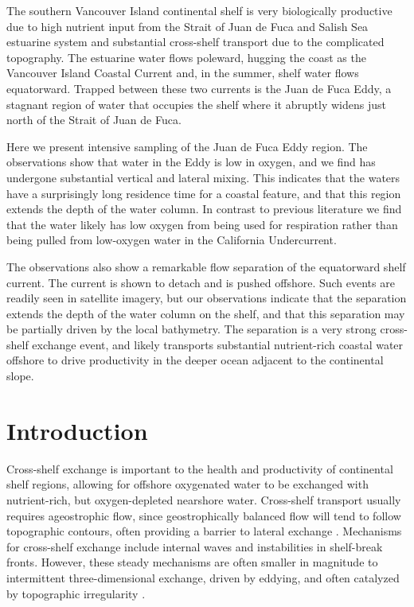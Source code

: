 \documentclass[draft]{agujournal2019}
\begin{document}
The southern Vancouver Island continental shelf is very biologically productive due to high nutrient input from the Strait of Juan de Fuca and Salish Sea estuarine system and substantial cross-shelf transport due to the complicated topography.  The estuarine water flows poleward, hugging the coast as the Vancouver Island Coastal Current and, in the summer, shelf water flows equatorward.  Trapped between these two currents is the Juan de Fuca Eddy, a stagnant region of water that occupies the shelf where it abruptly widens just north of the Strait of Juan de Fuca.

Here we present intensive sampling of the Juan de Fuca Eddy region. The observations show that water in the Eddy is low in oxygen, and we find has undergone substantial vertical and lateral mixing. This indicates that the waters have a surprisingly long residence time for a coastal feature, and that this region extends the depth of the water column.  In contrast to previous literature we find that the water likely has low oxygen from being used for respiration rather than being pulled from low-oxygen water in the California Undercurrent.

The observations also show a remarkable flow separation of the equatorward shelf current.  The current is shown to detach and is pushed offshore. Such events are readily seen in satellite imagery, but our observations indicate that the separation extends the depth of the water column on the shelf, and that this separation may be partially driven by the local bathymetry.  The separation is a very strong cross-shelf exchange event, and likely transports substantial nutrient-rich coastal water offshore to drive productivity in the deeper ocean adjacent to the continental slope.

%
%


\section{Introduction}

Cross-shelf exchange is important to the health and productivity of continental shelf regions, allowing for offshore oxygenated water to be exchanged with nutrient-rich, but oxygen-depleted nearshore water.  Cross-shelf transport usually requires ageostrophic flow, since geostrophically balanced flow will tend to follow topographic contours, often providing a barrier to lateral exchange \cite{brink16}.  Mechanisms for cross-shelf exchange include internal waves and instabilities in shelf-break fronts.  However, these steady mechanisms are often smaller in magnitude to intermittent three-dimensional exchange, driven by eddying, and often catalyzed by topographic irregularity \cite{barthetal00}.
\end{document}
